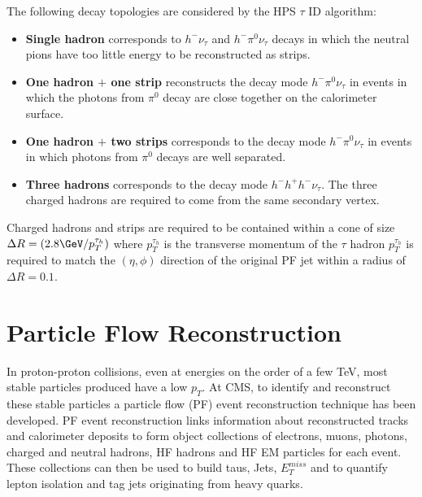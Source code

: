 The following decay topologies are considered by the HPS $\tau$ ID algorithm:
\begin{itemize}
\item{\bf Single hadron}
      corresponds to $ h^{-} \nu_{\tau}$
      and $ h^{-} \pi^{0} \nu_{\tau}$ decays
      in which the neutral pions have too little energy to be reconstructed as strips.
\item{\bf One hadron $+$ one strip}
      reconstructs the decay mode $ h^{-} \pi^{0} \nu_{\tau}$
      in events in which the photons from $\pi^{0}$ decay
      are close together on the calorimeter surface.
\item{\bf One hadron $+$ two strips}
      corresponds to the decay mode $ h^{-} \pi^{0} \nu_{\tau}$
      in events in which photons from $\pi^{0}$ decays are well separated.
\item{\bf Three hadrons}
      corresponds to the decay mode $ h^{-} h^{+} h^{-} \nu_{\tau}$.
      The three charged hadrons are required                                                                                                      
      to come from the same secondary vertex.
\end {itemize}

Charged hadrons and strips are required to be contained within a cone
of size $\Delta R=(2.8\GeV/p_{T}^{\tau_{h}})$ where $p_{T}^{\tau_{h}}$ is 
the transverse momentum of the $\tau$ hadron $p_{T}^{\tau_{h}}$ is 
required to match the $(\eta,\phi)$ direction of the original PF jet within
a radius of $\Delta R=0.1$. 


\section{Particle Flow Reconstruction}
In proton-proton collisions, even at energies on the order of a few TeV, 
most stable particles produced have a low $p_{T}$.
At CMS, to identify and reconstruct these stable particles a particle flow (PF) event 
reconstruction technique has been developed. PF event reconstruction links 
information %
about reconstructed tracks and calorimeter deposits
to form object collections of 
electrons, muons, photons, charged and neutral hadrons, HF hadrons and HF EM particles
for each event. These collections can then be used to build taus, Jets, $E_{T}^{miss}$
and to quantify lepton isolation and tag jets originating from heavy quarks.

